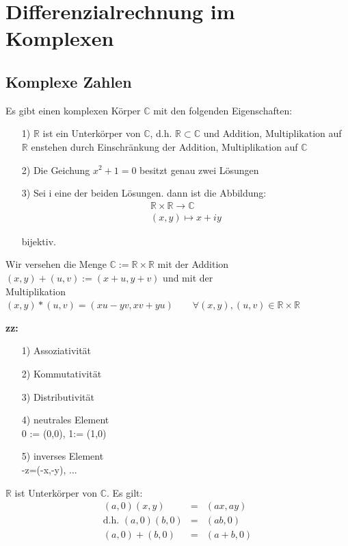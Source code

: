 \section{Differenzialrechnung im Komplexen}
\subsection{Komplexe Zahlen}
\begin{satz}
	Es gibt einen komplexen Körper $\mathds{C}$ mit den folgenden Eigenschaften:
	\begin{itemize}
		\item[1)]
		$\mathds{R}$ ist ein Unterkörper von $\mathds{C}$, d.h. $\mathds{R} \subset \mathds{C}$ und Addition, Multiplikation auf $\mathds{R}$ enstehen durch Einschränkung der Addition, Multiplikation auf $\mathds{C}$
		\item[2)]
		Die Geichung $ x^2 + 1 = 0$ besitzt genau zwei Lösungen
		\item[3)]
		Sei i eine der beiden Lösungen. dann ist die Abbildung:
		\begin{eqnarray*}
			\mathds{R} \times \mathds{R} \to  \mathds{C} \\
			(x,y) \mapsto x+ iy
		\end{eqnarray*}
		
		bijektiv.\\
	\end{itemize}
\end{satz}

\begin{bew}
Wir versehen die Menge $\mathds{C} := \mathds{R} \times \mathds{R}$ mit der Addition $(x,y) + (u,v) := (x+u,y+v)$ und mit der \\
Multiplikation $(x,y)* (u,v) = (xu-yv, xv+yu) \qquad \forall (x,y),(u,v) \in \mathds{R} \times \mathds{R}$\\
\end{bew}
\textbf{zz:}
\begin{itemize}
	\item[1)] Assoziativität
	\item[2)] Kommutativität 
	\item[3)] Distributivität 
	\item[4)] neutrales Element\\
	0 := (0,0), 1:= (1,0)
	\item[5)] inverses Element\\
	-z=(-x,-y), ...
\end{itemize}


$\mathds{R}$ ist Unterkörper von $\mathds{C}$. Es gilt:\\
\begin{eqnarray*}
	(a,0)(x,y) &=& (ax,ay)\\
	\text{d.h. }(a,0)(b,0)&=&(ab,0)\\
	(a,0)+(b,0) &=& (a+b,0)
\end{eqnarray*}

